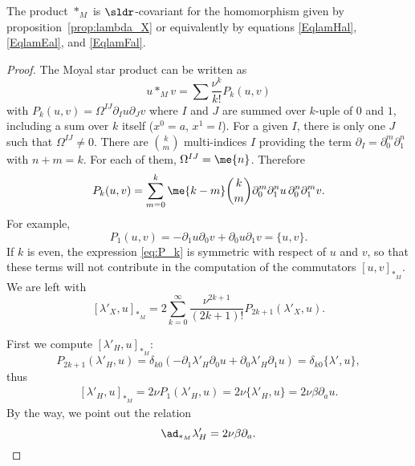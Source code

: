 \begin{proposition}
   The product $\ast_M$ is $\sldr$-covariant for the homomorphism given by proposition~\ref{prop:lambda_X} or equivalently by equations \eqref{EqlamHal}, \eqref{EqlamEal}, and \eqref{EqlamFal}.
\end{proposition}

\begin{proof}
The Moyal star product can be written as
\[
   u\ast_M v=\sum \frac{\nu^k}{k!}P_k(u,v)
\]
with $P_k(u,v)=\Omega^{IJ}\partial_Iu\partial_Jv$ where $I$ and $J$ are summed over $k$-uple of $0$ and $1$, including a sum over $k$ itself ($x^0=a$, $x^1=l$). For a given $I$, there is only one $J$ such that $\Omega^{IJ}\neq 0$. There are $\binom{k}{m}$ multi-indices $I$ providing the term $\partial_I=\partial_0^m\partial_1^n$ with $n+m=k$. For each of them, $\Omega^{IJ}=\me{n}$. Therefore
\begin{equation}\label{eq:P_k}
  P_k(u,v)=\sum_{m=0}^k\me{k-m}\binom{k}{m}\partial_0^m\partial_1^nu\,\partial_0^n\partial_1^mv.
\end{equation}
For example,
\[
  P_1(u,v)=-\partial_1u\partial_0v+\partial_0u\partial_1v=\{u,v\}.
\]
If $k$ is even, the expression \eqref{eq:P_k} is symmetric with respect of $u$ and $v$, so that these terms will not contribute in the computation of the commutators $[u,v]_{\ast_M}$. We are left with
\begin{equation}\label{eq:comm_lambda_X}
   [\lambda'_X,u]_{\ast_M}
         =2\sum_{k=0}^{\infty}\frac{\nu^{2k+1}}{(2k+1)!}P_{2k+1}(\lambda'_X,u).
\end{equation}

First we compute $[\lambda'_H,u]_{\ast_M}$:
\begin{equation}
   P_{2k+1}(\lambda'_H,u)=\delta_{k0}(-\partial_1\lambda'_H\partial_0 u+\partial_0\lambda'_H\partial_1 u)=\delta_{k0}\{\lambda',u\},
\end{equation}
thus
\begin{equation}
\begin{split}
  [\lambda'_H,u]_{\ast_M}=2\nu P_1(\lambda'_H,u)
                        =2\nu\{\lambda'_H,u\}
            =2\nu\beta\partial_au.
\end{split}
\end{equation}
By the way, we point out the relation
\[
\ad_{\ast_M}\lambda'_H=2\nu\beta\partial_a.
\]


\end{proof}
